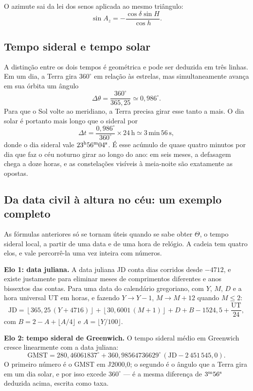 \documentclass[11pt,a4paper]{article}
\begin{document}
O azimute sai da lei dos senos aplicada ao mesmo triângulo:
\[
\sin A_z=-\frac{\cos\delta\sin H}{\cos h}.
\]

\subsection*{Tempo sideral e tempo solar}

A distinção entre os dois tempos é geométrica e pode ser deduzida em três linhas. Em um dia, a Terra gira $360^\circ$ em relação às estrelas, mas simultaneamente avança em sua órbita um ângulo
\[
\Delta\theta=\frac{360^\circ}{365{,}25}\simeq0{,}986^\circ.
\]
Para que o Sol volte ao meridiano, a Terra precisa girar esse tanto a mais. O dia solar é portanto mais longo que o sideral por
\[
\Delta t=\frac{0{,}986^\circ}{360^\circ}\times24\,\mathrm{h}\simeq3\,\mathrm{min}\,56\,\mathrm{s},
\]
donde o dia sideral vale $23^{\rm h}56^{\rm m}04^{\rm s}$. É esse acúmulo de quase quatro minutos por dia que faz o céu noturno girar ao longo do ano: em seis meses, a defasagem chega a doze horas, e as constelações visíveis à meia-noite são exatamente as opostas.

\subsection*{Da data civil à altura no céu: um exemplo completo}

As fórmulas anteriores só se tornam úteis quando se sabe obter $\Theta$, o tempo sideral
local, a partir de uma data e de uma hora de relógio. A cadeia tem quatro elos, e vale
percorrê-la uma vez inteira com números.

\textbf{Elo 1: data juliana.} A data juliana JD conta dias corridos desde
$-4712$, e existe justamente para eliminar meses de comprimentos diferentes e anos
bissextos das contas. Para uma data do calendário gregoriano, com $Y$, $M$, $D$ e a hora
universal UT em horas, e fazendo $Y\to Y-1$, $M\to M+12$ quando $M\le2$:
\[
\mathrm{JD}=\left\lfloor365{,}25\,(Y+4716)\right\rfloor
+\left\lfloor30{,}6001\,(M+1)\right\rfloor+D+B-1524{,}5+\frac{\mathrm{UT}}{24},
\]
com $B=2-A+\lfloor A/4\rfloor$ e $A=\lfloor Y/100\rfloor$.

\textbf{Elo 2: tempo sideral de Greenwich.} O tempo sideral médio em Greenwich cresce
linearmente com a data juliana:
\[
\mathrm{GMST}=280{,}46061837^\circ+360{,}98564736629^\circ\,(\mathrm{JD}-2\,451\,545{,}0).
\]
O primeiro número é o GMST em J2000{,}0; o segundo é o ângulo que a Terra gira em um dia
solar, e por isso excede $360^\circ$ --- é a mesma diferença de $3^{\rm m}56^{\rm s}$
deduzida acima, escrita como taxa.
\end{document}
